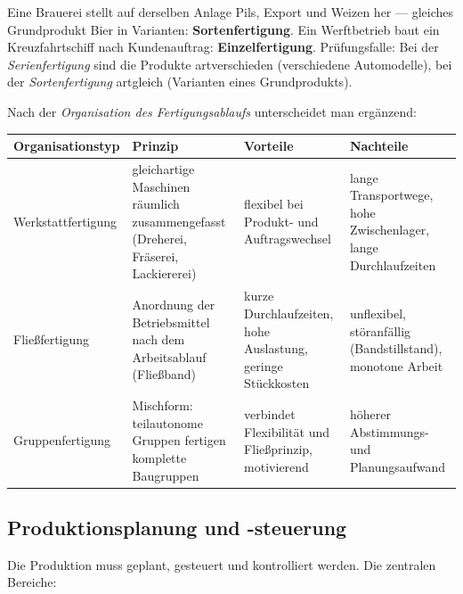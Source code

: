 \documentclass[11pt, a4paper]{article}
\begin{document}
\begin{beispiel}
Eine Brauerei stellt auf derselben Anlage Pils, Export und Weizen her --- gleiches
Grundprodukt Bier in Varianten: \textbf{Sortenfertigung}. Ein Werftbetrieb baut ein
Kreuzfahrtschiff nach Kundenauftrag: \textbf{Einzelfertigung}. Prüfungsfalle: Bei der
\emph{Serienfertigung} sind die Produkte artverschieden (verschiedene Automodelle), bei
der \emph{Sortenfertigung} artgleich (Varianten eines Grundprodukts).
\end{beispiel}

Nach der \emph{Organisation des Fertigungsablaufs} unterscheidet man ergänzend:

\begin{center}
\begin{tabular}{p{3.2cm} p{4.6cm} p{3.1cm} p{3.1cm}}
\textbf{Organisationstyp} & \textbf{Prinzip} & \textbf{Vorteile} & \textbf{Nachteile}\\
\hline
Werkstattfertigung & gleichartige Maschinen räumlich zusammengefasst (Dreherei,
Fräserei, Lackiererei) & flexibel bei Produkt- und Auftragswechsel & lange
Transportwege, hohe Zwischenlager, lange Durchlaufzeiten\\
Fließfertigung & Anordnung der Betriebsmittel nach dem Arbeitsablauf (Fließband) &
kurze Durchlaufzeiten, hohe Auslastung, geringe Stückkosten & unflexibel,
störanfällig (Bandstillstand), monotone Arbeit\\
Gruppenfertigung & Mischform: teilautonome Gruppen fertigen komplette Baugruppen &
verbindet Flexibilität und Fließprinzip, motivierend & höherer Abstimmungs- und
Planungsaufwand\\
\end{tabular}
\end{center}

\subsection{Produktionsplanung und -steuerung}

Die Produktion muss geplant, gesteuert und kontrolliert werden. Die zentralen Bereiche:
\end{document}
